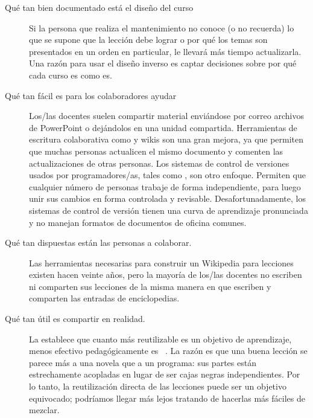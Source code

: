 \begin{description}
 
\item[Qué tan bien documentado está el diseño del curso]
  Si la persona que realiza el mantenimiento no conoce (o no recuerda)
  lo que se supone que la lección debe lograr
  o por qué los temas son presentados en un orden en particular,
  le llevará más tiempo actualizarla.
  Una razón para usar el diseño inverso
  es captar decisiones sobre por qué cada curso es como es.
 
\item[Qué tan fácil es para los colaboradores ayudar]
  Los/las docentes suelen compartir material enviándose por correo archivos de PowerPoint o dejándolos en una unidad compartida.
  Herramientas de escritura colaborativa como  y wikis
  son una gran mejora,
  ya que permiten que muchas personas actualicen el mismo documento
  y comenten las actualizaciones de otras personas.
  Los sistemas de control de versiones usados por programadores/as,
  tales como ,
  son otro enfoque.
  Permiten que cualquier número de personas trabaje de forma independiente,
  para luego unir sus cambios en forma controlada y revisable.
  Desafortunadamente,
  los sistemas de control de versión tienen una curva de aprendizaje pronunciada
   y no manejan formatos de documentos de oficina comunes.
 
\item[Qué tan dispuestas están las personas a colaborar.]
  Las herramientas necesarias para construir un Wikipedia para lecciones
  existen hacen veinte años,
  pero la mayoría de los/las docentes no escriben ni comparten sus lecciones
  de la misma manera en que escriben y comparten las entradas de enciclopedias.
 
\item[Qué tan útil es compartir en realidad.]
  La  establece que
  cuanto más reutilizable es un objetivo de aprendizaje,
  menos efectivo pedagógicamente es ~\cite{Wile2002}.
  La razón es que una buena lección se parece más a una novela que a un programa:
  sus partes están estrechamente acopladas en lugar de ser cajas negras independientes.
  Por lo tanto, la reutilización directa de las lecciones puede ser un objetivo equivocado;
  podríamos llegar más lejos tratando de hacerlas más fáciles de mezclar.
 \end{description}


